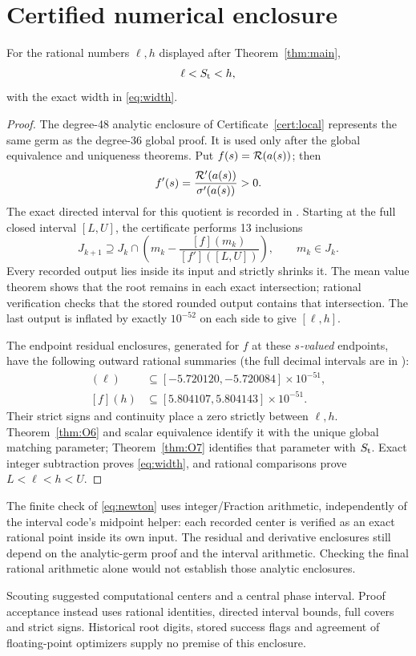 \section{Certified numerical enclosure}\label{sec:enclosure}
\begin{theorem}\label{thm:O8}
For the rational numbers \(\ell,h\) displayed after Theorem~\ref{thm:main},
\[
 \ell<S_{\mathrm t}<h,
\]
with the exact width in \eqref{eq:width}.
\end{theorem}
\begin{proof}
The degree-48 analytic enclosure of Certificate~\ref{cert:local}
represents the same germ as the degree-36 global proof. It is used only
after the global equivalence and uniqueness theorems. Put
\(f(s)=\mathcal R(a(s))\); then
\[
 f'(s)=\frac{\mathcal R'(a(s))}{\sigma'(a(s))}>0.
\]
The exact directed interval for this quotient is recorded in
. Starting at the full closed interval \([L,U]\),
the certificate performs 13 inclusions
\begin{equation}\label{eq:newton}
 J_{k+1}\supseteq
 J_k\cap\left(m_k-\frac{[f](m_k)}{[f']([L,U])}\right),\qquad
 m_k\in J_k.
\end{equation}
Every recorded output lies inside its input and strictly shrinks it.
The mean value theorem shows that the root remains in each exact
intersection; rational verification checks that the stored rounded
output contains that intersection. The last output is inflated by
exactly \(10^{-52}\) on each side to give \([\ell,h]\).

The endpoint residual enclosures, generated for \(f\) at these
\emph{\(s\)-valued} endpoints, have the following outward rational
summaries (the full decimal intervals are in ):
\begin{align*}
 [f](\ell)&\subseteq[-5.720120,-5.720084]\times10^{-51},\\
 [f](h)&\subseteq[5.804107,5.804143]\times10^{-51}.
\end{align*}
Their strict signs and continuity place a zero strictly between
\(\ell,h\). Theorem~\ref{thm:O6} and scalar equivalence identify it with
the unique global matching parameter; Theorem~\ref{thm:O7} identifies
that parameter with \(S_{\mathrm t}\). Exact integer subtraction proves
\eqref{eq:width}, and rational comparisons prove \(L<\ell<h<U\).
\end{proof}

The finite check of \eqref{eq:newton} uses integer/Fraction arithmetic,
independently of the interval code's midpoint helper: each recorded center
is verified as an exact rational point inside its own input. The
residual and derivative enclosures still depend on the analytic-germ
proof and the interval arithmetic. Checking the final rational arithmetic
alone would not establish those analytic enclosures.

Scouting suggested computational centers and a central phase interval.
Proof acceptance instead uses rational identities, directed interval
bounds, full covers and strict signs. Historical root digits, stored
success flags and agreement of floating-point optimizers supply no
premise of this enclosure.
